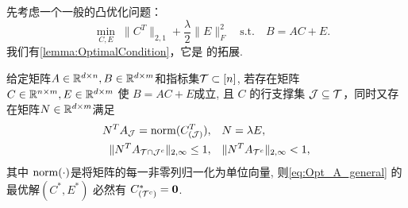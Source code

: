 先考虑一个一般的凸优化问题：
\begin{equation}\label{eq:Opt_A_general}
  \quad \min_{C, E} \; \|C^T\|_{2,1}+\frac{\lambda}{2}\|E\|^2_F \quad
  \text{s.t.} \quad B=AC+E.
\end{equation}
我们有\autoref{lemma:OptimalCondition}，它是
\cite[引理~7.1]{soltanolkotabi2012geometric}的拓展.
\begin{lemma}\label{lemma:OptimalCondition}
  给定矩阵\(A\in \mathbb{R}^{d\times n}, B \in \mathbb{R}^{d\times m}\)和指标集\(\mathcal{T}\subset [n]\),
  若存在矩阵 \(C\in \mathbb{R}^{n\times m},E\in \mathbb{R}^{d\times m}\) 使 \(B=AC+E\)成立, 且
  \(C\) 的行支撑集 \(\mathcal{J}\subseteq
  \mathcal{T}\)，同时又存在矩阵\(N\in\mathbb{R}^{d\times m}\)满足
  \begin{align*}
    N^T A_{\mathcal{J}} = \operatorname{norm}(C_{(\mathcal{J})}^T),  & \quad N=\lambda E, \\
    \|N^T A_{\mathcal{T}\cap \mathcal{J}^{c}}\|_{2, \infty} \leq 1, & \quad \|N^T A_{\mathcal{T}^{c}}\|_{2, \infty}<1,
  \end{align*}
  其中 \(\operatorname{norm}(\cdot)\)是将矩阵的每一非零列归一化为单位向量,
  则\eqref{eq:Opt_A_general} 的最优解\((C^{*},E^{*})\) 必然有
  \(C^*_{(\mathcal{T}^c)}=\mathbf{0}\).
\end{lemma}
